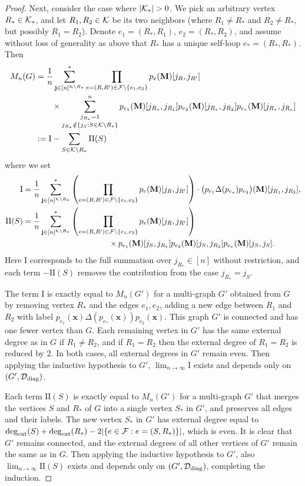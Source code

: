 \documentclass[10pt,reqno]{amsart}
\def\x{\mathbf{x}}
\newcommand{\degext}{\deg_\mathrm{ext}}
\newcommand{\tdiag}{\mathrm{diag}}
\begin{document}
\begin{proof}
Next, consider the case where $|\cK_*|>0$. We pick an arbitrary vertex
$R_*\in\mathcal{K}_*$, 
and let $R_1,R_2\in\mathcal{K}$ be its two neighbors (where $R_1 \neq R_*$ and $R_2 \neq
R_*$, but possibly $R_1=R_2$). Denote $e_1=(R_*,R_1)$, $e_2=(R_*,R_2)$, and
assume without loss of generality as above that $R_*$ has a unique self-loop
$e_*=(R_*,R_*)$. Then
\begin{align*}
	M_n(G) &= 
	\frac{1}{n}\sum_{\mathbf{j}\in[n]^{\mathcal{K}\setminus R_*}}^* \prod_{e=(R,R')\in\mathcal{F}\setminus\{e_1,e_2\}} 
	p_e(\mathbf{M})[j_R,j_{R'}]\\
	&\qquad \times \mathop{\sum_{j_{R_*}=1}^n}_{j_{R_*} \notin \{j_S:S \in \mathcal{K} \setminus
R_*\}} p_{e_1}(\mathbf{M})[j_{R_*},j_{R_1}] 
	p_{e_2}(\mathbf{M})[j_{R_*}, j_{R_2}] p_{e_*}(\mathbf{M})[j_{R_*},j_{R_*}]\\
	&:=\mathrm{I}-\sum_{S \in \mathcal{K} \setminus R_*} \mathrm{II}(S)
\end{align*}
where we set
\begin{align*}
\mathrm{I}&=\frac{1}{n}\sum_{\mathbf{j}\in[n]^{\mathcal{K}\setminus R_*}}^*
\left(\prod_{e=(R,R')\in\mathcal{F}\setminus\{e_1,e_2\}} p_e(\mathbf{M})[j_R,j_{R'}]\right)
\cdot \big(p_{e_1}\Delta(p_{e_*}) p_{e_2}\big)(\mathbf{M})
	[j_{R_1}, j_{R_2}],\\
\mathrm{II}(S)&=\frac{1}{n}\sum_{\mathbf{j}\in[n]^{\mathcal{K}\setminus R_*}}^*
\left(\prod_{e=(R,R')\in\mathcal{F}\setminus\{e_1,e_2\}} p_e(\mathbf{M})[j_R,j_{R'}]\right)\\
&\hspace{1.5in}
\times p_{e_1}(\mathbf{M})[j_S,j_{R_1}]p_{e_2}(\mathbf{M})[j_S,j_{R_2}]p_{e_*}(\mathbf{M})[j_S,j_S].\notag
\end{align*}
Here $\mathrm{I}$ corresponds to the full summation over $j_{R_*} \in [n]$
without restriction, and each term $-\mathrm{II}(S)$ removes the contribution from
the case $j_{R_*}=j_S$.

The term $\mathrm{I}$ is exactly equal to $M_n(G')$ for a 
multi-graph $G'$ obtained from $G$ by removing vertex $R_*$ and the edges
$e_1,e_2$, adding a new edge between $R_1$ and $R_2$ with label
$p_{e_1}(\x) \Delta(p_{e_*}(\x)) p_{e_2}(\x)$. This graph
$G'$ is connected and has one fewer vertex than $G$. Each remaining
vertex in $G'$ has the same external degree as in $G$ if
$R_1 \neq R_2$, and if $R_1=R_2$ then the external degree of $R_1=R_2$ is
reduced by 2. In both cases, all external degrees in $G'$ remain
even. Then applying the inductive hypothesis to $G'$,
$\lim_{n \to \infty} \mathrm{I}$ exists and depends only on
$(G',\cD_\tdiag)$.

Each term $\mathrm{II}(S)$ is exactly equal to $M_n(G')$ for a multi-graph $G'$
that merges the vertices $S$ and $R_*$ of $G$ into a single vertex $S_*$ in $G'$,
and preserves all edges and their labels. The new vertex $S_*$
in $G'$ has external degree
equal to $\degext(S)+\degext(R_*)-2|\{e \in \cF:e=(S,R_*)\}|$, which is even.
It is clear that
$G'$ remains connected, and the external degrees of all other
vertices of $G'$ remain the same as in $G$. Then applying the inductive
hypothesis to $G'$, also $\lim_{n \to \infty} \mathrm{II}(S)$
exists and depends only on $(G',\cD_\tdiag)$, completing the induction.
\end{proof}
\end{document}
